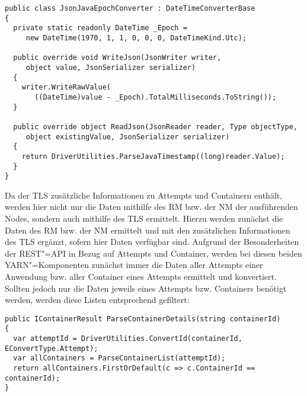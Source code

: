 \begin{lstlisting}[label=lst:javaEpochConverter,style=cs,
caption={[Entwickelter Konverter für Java"=Zeitstempel zur Nutzung mit Json.NET]
    Entwickelter Konverter für Java"=Zeitstempel zur Nutzung mit Json.NET.
    Dieser erbt dafür von \texttt{DateTimeConverterBase} des Json.NET"=Frameworks, damit der \texttt{JsonJavaEpochConverter} auch zur Konvertierung genutzt werden kann.}]
public class JsonJavaEpochConverter : DateTimeConverterBase
{
  private static readonly DateTime _Epoch =
     new DateTime(1970, 1, 1, 0, 0, 0, DateTimeKind.Utc);

  public override void WriteJson(JsonWriter writer,
     object value, JsonSerializer serializer)
  {
    writer.WriteRawValue(
       ((DateTime)value - _Epoch).TotalMilliseconds.ToString());
  }
  
  public override object ReadJson(JsonReader reader, Type objectType,
     object existingValue, JsonSerializer serializer)
  {
    return DriverUtilities.ParseJavaTimestamp((long)reader.Value);
  }
}
\end{lstlisting}

Da der \gls{TLS} zusätzliche Informationen zu Attempts und Containern enthält, werden hier nicht nur die Daten mithilfe des \gls{RM} bzw. der \gls{NM} der ausführenden Nodes, sondern auch mithilfe des \gls{TLS} ermittelt.
Hierzu werden zunächst die Daten des \gls{RM} bzw. der \gls{NM} ermittelt und mit den zusätzlichen Informationen des \gls{TLS} ergänzt, sofern hier Daten verfügbar sind.
Aufgrund der Besonderheiten der REST"=API in Bezug auf Attempts und Container, werden bei diesen beiden YARN"=Komponenten zunächst immer die Daten aller Attempts einer Anwendung bzw. aller Container eines Attempts ermittelt und konvertiert.
Sollten jedoch nur die Daten jeweils eines Attempts bzw. Containers benötigt werden, werden diese Listen entsprechend gefiltert:

\begin{lstlisting}[label=lst:restParseDetails,style=cs,
caption={[Konvertierung und Rückgabe eines Containers durch den RestParser]
    Konvertierung und Rückgabe eines Containers durch den \texttt{RestParser}.
    Hierbei muss für den hier gezeigten, einzelnen Container zunächst die ID des übergeordneten Attempts ermittelt werden, bevor aus der Liste aller Container die Daten des gesuchten Containers zurückgegeben werden können.
    Bei Attempts ist dieses Vorgehen analog.}]
public IContainerResult ParseContainerDetails(string containerId)
{
  var attemptId = DriverUtilities.ConvertId(containerId, EConvertType.Attempt);
  var allContainers = ParseContainerList(attemptId);
  return allContainers.FirstOrDefault(c => c.ContainerId == containerId);
}
\end{lstlisting}

